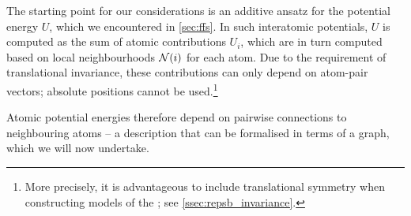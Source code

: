 The starting point for our considerations is an additive ansatz for the potential energy $U$, which we encountered in \cref{sec:ffs}.
In such interatomic potentials, $U$ is computed as the sum of atomic contributions $U_i$, which are in turn computed based on local neighbourhoods $\mathcal{N}(i)$ for each atom.
Due to the requirement of translational invariance, these contributions can only depend on atom-pair vectors; absolute positions cannot be used.\footnote{More precisely, it is advantageous to include translational symmetry when constructing models of the \bo \pes; see \cref{ssec:repsb_invariance}.}

Atomic potential energies therefore depend on pairwise connections to neighbouring atoms -- a description that can be formalised in terms of a graph, which we will now undertake.
